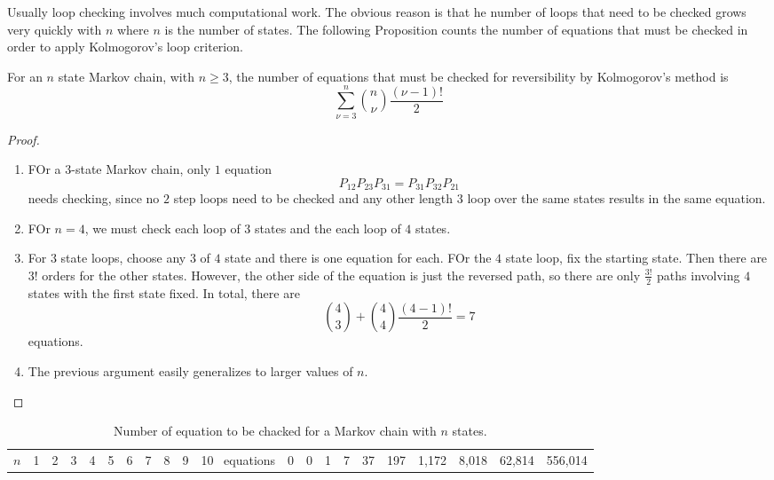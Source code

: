 \documentclass[12pt]{article}
\begin{document}
Usually loop checking involves much computational work.  The obvious
reason is that he number of loops that need
to be checked grows very quickly with $n$ where $n$ is the number of states. 
The following Proposition counts the number of equations that must be checked in order to
apply Kolmogorov’s loop criterion.

\begin{proposition}
For an $n$ state Markov chain, with $n \ge 3$, the number of
equations that must be checked for reversibility by Kolmogorov’s method is
\[
  \sum_{\nu=3}^n \binom{n}{\nu} \frac{(\nu-1)!}{2}
\]

\end{proposition}

\begin{proof}
  \begin{enumerate}
  \item FOr a $3$-state Markov chain, only $1$ equation
    \[
      P_{12}P_{23}P_{31} = P_{31} P_{32} P_{21}
    \]
    needs checking, since no $2$ step loops need to be checked and any
    other length $3$ loop over the same states results in the same
    equation.
  \item FOr $n=4$, we must check each loop of $3$ states and the each
    loop of $4$ states.
  \item For $3$ state loops, choose any $3$ of $4$ state and there is
    one equation for each.  FOr the $4$ state loop, fix the starting
    state.  Then there are $3!$ orders for the other states.  However,
     the other side of the equation is just the reversed path, so
     there are only $\frac{3!}{2}$ paths involving $4$ states with the
     first state fixed.  In total, there are
     \[
       \binom{4}{3} + \binom{4}{4} \frac{(4-1)!}{2} = 7
     \]
     equations.
   \item The previous argument easily generalizes to larger values of $n$.
  \end{enumerate}
\end{proof}

\begin{table}
  \centering
  \begin{tabular}{ccccccccccc}
    $n$& 1&2 &3 &4 &5 &6 & 7 & 8 & 9 & 10 \
    equations & 0 & 0 & 1 & 7 & 37 & 197 & 1{,}172 & 8{,}018 & 62{,}814 & 556{,}014
  \end{tabular}
  \caption{Number of equation to be chacked for a Markov chain with
    $n$ states.}
  \label{tab:reversiblemarkovchains:loopeqns}
\end{table}
\end{document}
